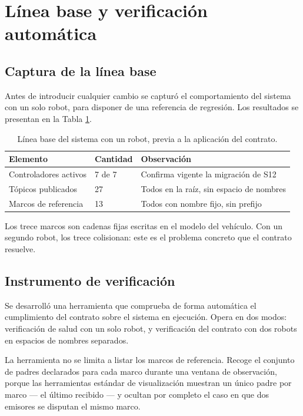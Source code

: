 \documentclass[12pt,letterpaper]{article}
\begin{document}
\section{Línea base y verificación automática}

\subsection{Captura de la línea base}

Antes de introducir cualquier cambio se capturó el comportamiento del sistema con un solo robot, para disponer de una referencia de regresión. Los resultados se presentan en la Tabla \ref{tab:linea_base}.

\begin{table}[H]
    \centering
    \small
    \caption{Línea base del sistema con un robot, previa a la aplicación del contrato.}
    \label{tab:linea_base}
    \begin{tabular}{@{}lll@{}}
        \toprule
        \textbf{Elemento} & \textbf{Cantidad} & \textbf{Observación} \\ \midrule
        Controladores activos & 7 de 7 & Confirma vigente la migración de S12 \\
        Tópicos publicados    & 27     & Todos en la raíz, sin espacio de nombres \\
        Marcos de referencia  & 13     & Todos con nombre fijo, sin prefijo \\ \bottomrule
    \end{tabular}
\end{table}

Los trece marcos son cadenas fijas escritas en el modelo del vehículo. Con un segundo robot, los trece colisionan: este es el problema concreto que el contrato resuelve.

\subsection{Instrumento de verificación}

Se desarrolló una herramienta que comprueba de forma automática el cumplimiento del contrato sobre el sistema en ejecución. Opera en dos modos: verificación de salud con un solo robot, y verificación del contrato con dos robots en espacios de nombres separados.

La herramienta no se limita a listar los marcos de referencia. Recoge el conjunto de padres declarados para cada marco durante una ventana de observación, porque las herramientas estándar de visualización muestran un único padre por marco --- el último recibido --- y ocultan por completo el caso en que dos emisores se disputan el mismo marco.
\end{document}
